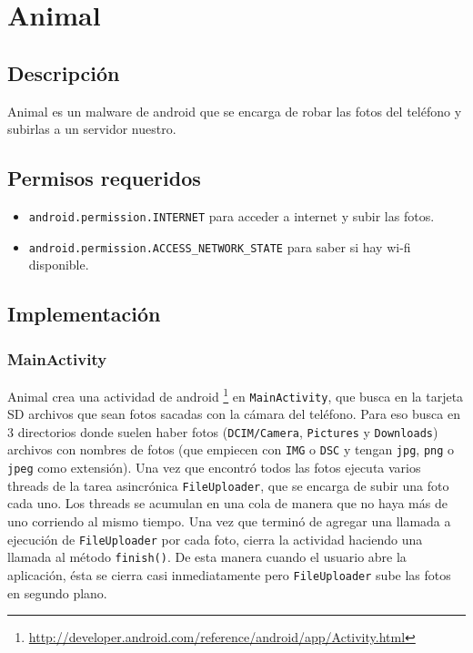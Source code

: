 \section{Animal}

	\subsection{Descripción}

	Animal es un malware de android que se encarga de robar las fotos del teléfono y subirlas a un servidor nuestro. 

	\subsection{Permisos requeridos}
		\begin{itemize}
			\item \texttt{android.permission.INTERNET} para acceder a internet y subir las fotos.
			\item \texttt{android.permission.ACCESS\_NETWORK\_STATE} para saber si hay wi-fi disponible.
		\end{itemize}

	\subsection{Implementación}

		\subsubsection{MainActivity}
			Animal crea una actividad de android \footnote{ \url{http://developer.android.com/reference/android/app/Activity.html} } en \texttt{MainActivity}, que busca en la tarjeta SD archivos que sean fotos sacadas con la cámara del teléfono. Para eso busca en 3 directorios donde suelen haber fotos (\texttt{DCIM/Camera}, \texttt{Pictures} y \texttt{Downloads}) archivos con nombres de fotos (que empiecen con \texttt{IMG} o \texttt{DSC} y tengan \texttt{jpg}, \texttt{png} o \texttt{jpeg} como extensión). Una vez que encontró todos las fotos ejecuta varios threads de la tarea asincrónica \texttt{FileUploader}, que se encarga de subir una foto cada uno. Los threads se acumulan en una cola de manera que no haya más de uno corriendo al mismo tiempo. Una vez que terminó de agregar una llamada a ejecución de \texttt{FileUploader} por cada foto, cierra la actividad haciendo una llamada al método \texttt{finish()}. De esta manera cuando el usuario abre la aplicación, ésta se cierra casi inmediatamente pero \texttt{FileUploader} sube las fotos en segundo plano. 

